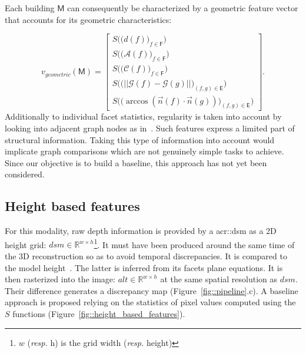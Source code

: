         Each building $\mathsf{M}$ can consequently be characterized by a geometric feature vector that accounts for its geometric characteristics:

        \begin{equation}
        	\label{eq::geom_feat}
            v_{geometric}(\mathsf{M}) = \begin{bmatrix}
            	S \Big(\big(d(f)\big)_{f \in \mathsf{F}}\Big)\\
                S \Big(\big(\mathscr{A}(f)\big)_{f \in \mathsf{F}}\Big)\\
                S \Big(\big(\mathscr{C}(f)\big)_{f \in \mathsf{F}}\Big)\\
                S \Big(\big( \vert\vert \mathscr{G}(f) - \mathscr{G}(g) \vert\vert \big)_{(f,g) \in \mathsf{E}}\Big)\\
                S\Big(\big( \arccos(\vec{n}(f) \cdot \vec{n}(g)) \big)_{(f,g) \in \mathsf{E}}\Big)
            \end{bmatrix}.
        \end{equation}
        Additionally to individual facet statistics, regularity is taken into account by looking into adjacent graph nodes as in~\parencite{zhou20102}.
        Such features express a limited  part of structural information.
        Taking this type of information into account would implicate graph comparisons which are not genuinely simple tasks to achieve.
        Since our objective is to build a baseline, this approach has not yet been considered.

    \subsection{Height based features}
        For this modality, raw depth information is provided by a \gls{acr::dsm} as a 2D height grid: $dsm \in \mathbb{R}^{w\times h}$\footnote{$w$ (\textit{resp.} h) is the grid width (\textit{resp.} height)}.
        It must have been produced around the same time of the 3D reconstruction so as to avoid temporal discrepancies.
        It is compared to the model height~\parencite{Bredif2007,zebedin2008fusion}.
        The latter is inferred from its facets plane equations.
        It is then rasterized into the image: $alt \in \mathbb{R}^{w\times h}$ at the same spatial resolution as $dsm$.
        Their difference generates a discrepancy map (Figure~\ref{fig::pipeline}.c).
        A baseline approach is proposed relying on the statistics of pixel values computed using the $S$ functions (Figure~\ref{fig::height_based_features}).

